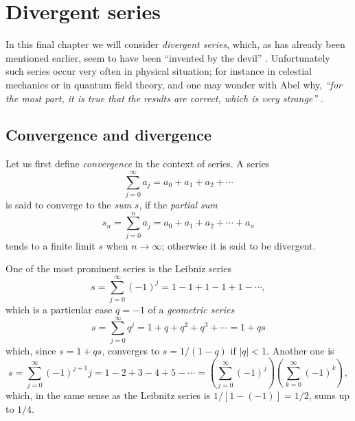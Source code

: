 \chapter{Divergent series}
\label{2011-m-ch-ds}
In this final chapter we will consider {\em divergent series}, which,
as has already been mentioned earlier,
seem to have been ``invented by the devil'' \cite{Hardy:1949}.
Unfortunately such series occur
very often in physical situation;
for instance in celestial mechanics or in quantum field theory,
and one may wonder with Abel why, {\em ``for the most part,
it is true that the results are correct, which is very strange''  }
\cite{rousseau-2004}.

\section{Convergence and divergence}
Let us first define {\em convergence} in the context of series.
A series
\begin{equation}
\sum_{j=0}^\infty a_j =a_0+a_1+a_2+\cdots
\end{equation}
is said to converge to the {\em sum}
$s$, if the {\em partial sum}
\begin{equation}
s_n=  \sum_{j=0}^n a_j =a_0+a_1+a_2+\cdots + a_n
\end{equation}
tends to a finite limit $s$ when $n\rightarrow \infty$;
otherwise it is said to be divergent.

One of the most prominent series is the Leibniz series~\cite{leibnitz-1860,moore-1938,Hardy:1949,everest-2003}
\begin{equation}
s = \sum_{j=0}^\infty (-1)^j=1-1+1-1+1-\cdots ,
\label{2009-fiftyfifty-1s}
\end{equation}
which is a particular case $q=-1$ of a {\em geometric series}
\begin{equation}
s = \sum_{j=0}^\infty q^j=1+q+q^2+q^3+ \cdots  =1+q s
\label{2009-fiftyfifty-1sgs}
\end{equation}
which, since $s=1+qs$, converges  to $s=1/(1-q)$ if $\vert q\vert <1$.
Another one is
\begin{equation}
s = \sum_{j=0}^\infty (-1)^{j+1} j =1-2+3-4+5-\cdots =
\left(\sum_{j=0}^\infty (-1)^j\right)
\left(\sum_{k=0}^\infty (-1)^k\right)
,
\label{2009-fiftyfifty-1s1}
\end{equation}
which, in the same sense as the Leibnitz series is $1/[1-(-1)]=1/2$, sums up to $1/4$.

